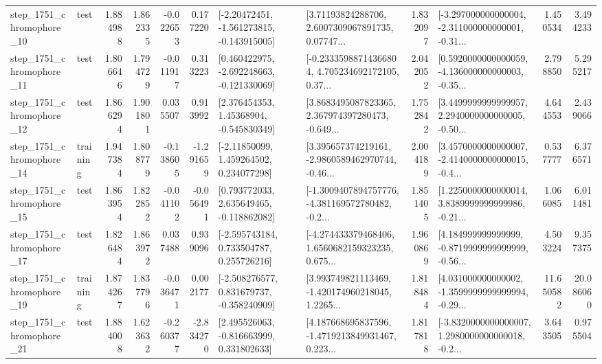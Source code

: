 \begin{tabular}{llrrrrllrlrr}
 step\_1751\_chromophore\_10 &      test &      1.884988 &    1.862335 &     -0.022653 &  0.177220 &   [-2.20472451, -1.561273815, -0.143915005] &  [3.71193824288706, 2.6007309067891735, 0.07747... &       1.832097 &  [-3.297000000000004, -2.311000000000001, -0.31... &            1.450534 &          3.494233 \\
 step\_1751\_chromophore\_11 &      test &      1.806646 &    1.794729 &     -0.011917 &  0.313223 &   [0.460422975, -2.692248663, -0.121330069] &  [-0.23335988714366804, 4.705234692172105, 0.37... &       2.042052 &  [0.5920000000000059, -4.136000000000003, -0.35... &            2.798850 &          5.295217 \\
 step\_1751\_chromophore\_12 &      test &      1.866294 &    1.901801 &      0.035507 &  0.913992 &     [2.376454353, 1.45368904, -0.545830349] &  [3.8683495087823365, 2.367974397280473, -0.649... &       1.752842 &  [3.4499999999999957, 2.2940000000000005, -0.50... &            4.644553 &          2.439066 \\
 step\_1751\_chromophore\_14 &  training &      1.947384 &    1.808779 &     -0.138605 & -1.291659 &     [-2.11850099, 1.459264502, 0.234077298] &  [3.395657374219161, -2.9860589462970744, -0.46... &       2.004189 &  [3.4570000000000007, -2.4140000000000015, -0.4... &            0.537777 &          6.376571 \\
 step\_1751\_chromophore\_15 &      test &      1.863954 &    1.822852 &     -0.041102 & -0.056491 &    [0.793772033, 2.635649465, -0.118862082] &  [-1.3009407894757776, -4.381169572780482, -0.2... &       1.851405 &  [1.2250000000000014, 3.8389999999999986, -0.21... &            1.066085 &          6.011481 \\
 step\_1751\_chromophore\_17 &      test &      1.826484 &    1.863972 &      0.037488 &  0.939096 &    [-2.595743184, 0.733504787, 0.255726216] &  [-4.274433379468406, 1.6560682159323235, 0.675... &       1.960869 &  [4.184999999999999, -0.8719999999999999, -0.56... &            4.503224 &          9.357375 \\
 step\_1751\_chromophore\_19 &  training &      1.874267 &    1.837796 &     -0.036471 &  0.002177 &   [-2.508276577, 0.831679737, -0.358240909] &  [3.993749821113469, -1.420174960218045, 1.2265... &       1.818484 &  [4.031000000000002, -1.3599999999999994, -0.29... &           11.650582 &         20.086060 \\
 step\_1751\_chromophore\_21 &      test &      1.884008 &    1.623632 &     -0.260377 & -2.834270 &    [2.495526063, -0.816663999, 0.331802633] &  [4.187668695837596, -1.4719213849931467, 0.223... &       1.817818 &  [-3.8320000000000007, 1.2980000000000018, -0.2... &            3.643505 &          0.975504 \\

\end{tabular}
